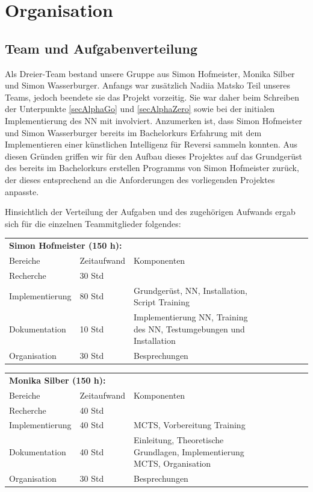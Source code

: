 \documentclass[12pt,a4paper]{article}
\begin{document}
\newpage

\section{Organisation}

\subsection{Team und Aufgabenverteilung}
Als Dreier-Team bestand unsere Gruppe aus Simon Hofmeister, Monika Silber und Simon Wasserburger. Anfangs war zusätzlich Nadiia Matsko Teil unseres Teams, jedoch beendete sie das Projekt vorzeitig. Sie war daher beim Schreiben der Unterpunkte  \ref{secAlphaGo} und \ref{secAlphaZero} sowie bei der initialen Implementierung des NN mit involviert. Anzumerken ist, dass Simon Hofmeister und Simon Wasserburger bereits im Bachelorkurs Erfahrung mit dem Implementieren einer künstlichen Intelligenz für Reversi sammeln konnten. Aus diesen Gründen griffen wir für den Aufbau dieses Projektes auf das Grundgerüst des bereits im Bachelorkurs erstellen Programms von Simon Hofmeister zurück, der dieses entsprechend an die Anforderungen des vorliegenden Projektes anpasste.

Hinsichtlich der Verteilung der Aufgaben und des zugehörigen Aufwands ergab sich für die einzelnen Teammitglieder folgendes:

\begin{tabular}{*{3}{p{4cm}p{3cm}p{8cm}}}
\multicolumn{3}{l}{\textbf{Simon Hofmeister (150 h):}} \\
Bereiche & Zeitaufwand & Komponenten \\
\cline{1-3}
Recherche & 30 Std &  \\
Implementierung & 80 Std & Grundgerüst, NN, Installation, Script Training  \\
Dokumentation & 10 Std & Implementierung NN, Training des NN, Testumgebungen und Installation \\
Organisation & 30 Std &  Besprechungen\\
\end{tabular}


\begin{tabular}{*{3}{p{4cm}p{3cm}p{8cm}}}
\multicolumn{3}{l}{\textbf{Monika Silber (150 h):}} \\
Bereiche & Zeitaufwand & Komponenten \\
\cline{1-3}
Recherche & 40 Std &  \\
Implementierung & 40 Std & MCTS, Vorbereitung Training  \\
Dokumentation & 40 Std &  Einleitung, Theoretische Grundlagen, Implementierung MCTS, Organisation \\
Organisation & 30 Std &  Besprechungen\\
\end{tabular}
\end{document}
